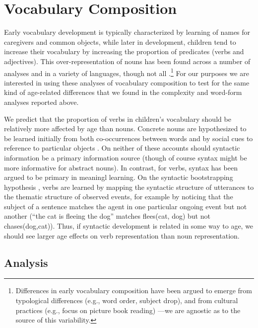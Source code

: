 \documentclass[10pt,letterpaper]{article}
\begin{document}
\section{Vocabulary Composition}

Early vocabulary development is typically characterized by learning of names for caregivers and common objects, while later in development, children tend to increase their vocabulary by increasing the proportion of predicates (verbs and adjectives). This over-representation of nouns has been found across a number of analyses and in a variety of languages, though not all \cite{caselli1995}.\footnote{Differences in early vocabulary composition have been argued to emerge from typological differences (e.g., word order, subject drop), and from cultural practices (e.g., focus on picture book reading) \cite{tardif1999, gopnik1996, choi1995}---we are agnostic as to the source of this variability.} For our purposes we are interested in using these analyses of vocabulary composition to test for the same kind of age-related differences that we found in the complexity and word-form analyses reported above. 

We predict that the proportion of verbs in children's vocabulary should be relatively more affected by age than nouns. Concrete nouns are hypothesized to be learned initially from both co-occurrences between words \cite{yu2007b} and by social cues to reference to particular objects \cite{bloom2002}. On neither of these accounts should syntactic information be a primary information source (though of course syntax might be more informative for abstract nouns). In contrast, for verbs, syntax has been argued to be primary in meaningl learning. On the syntactic bootstrapping hypothesis \cite{gleitman1990,fisher1991}, verbs are learned by  mapping the syntactic structure of utterances to the thematic structure of observed events, for example by noticing that the subject of a sentence matches the agent in one particular ongoing event but not another (``the cat is fleeing the dog'' matches  {\sc flees(cat, dog)} but not {\sc chases(dog,cat)}). Thus, if syntactic development is related in some way to age, we should see larger age effects on verb representation than noun representation. 

\subsection{Analysis}
\end{document}

